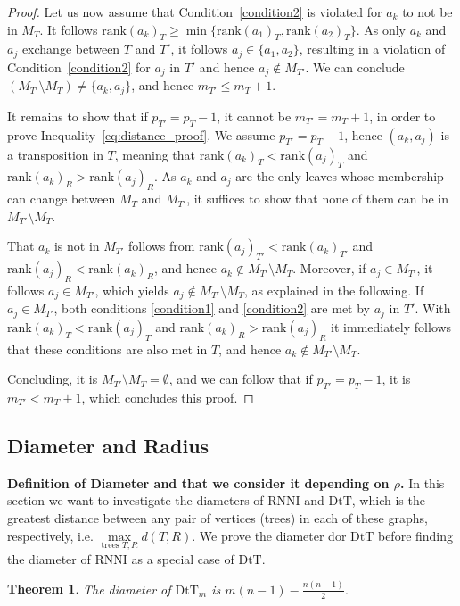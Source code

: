 \documentclass[11pt]{amsart}
\newtheorem{theorem}{Theorem}
\newcommand{\rnni}{\mathrm{RNNI}}
\newcommand{\rank}{\mathrm{rank}}
\newcommand{\dtt}{\mathrm{DtT}}
\newcommand{\summary}[1]{\textbf{#1}} %
\begin{document}
\begin{proof}
	Let us now assume that Condition~\ref{condition2} is violated for $a_k$ to not be in $M_T$.
	It follows $\rank(a_k)_T \geq \min\{\rank(a_1)_T, \rank(a_2)_T\}$.
	As only $a_k$ and $a_j$ exchange between $T$ and $T'$, it follows $a_j \in \{a_1, a_2\}$, resulting in a violation of Condition~\ref{condition2} for $a_j$ in $T'$ and hence $a_j \notin M_{T'}$.
	We can conclude $(M_{T'} \setminus M_T) \neq \{a_k, a_j\}$, and hence $m_{T'} \leq m_T + 1$.

	It remains to show that if $p_{T'} = p_T - 1$, it cannot be $m_{T'} = m_T + 1$, in order to prove Inequality~\ref{eq:distance_proof}.
	We assume $p_{T'} = p_T - 1$, hence $(a_k, a_j)$ is a transposition in $T$, meaning that $\rank(a_k)_T < \rank(a_j)_T$ and $\rank(a_k)_R > \rank(a_j)_R$.
	As $a_k$ and $a_j$ are the only leaves whose membership can change between $M_T$ and $M_{T'}$, it suffices to show that none of them can be in $M_{T'} \setminus M_T$.

	That $a_k$ is not in $M_{T'}$ follows from $\rank(a_j)_{T'} < \rank(a_k)_{T'}$ and $\rank(a_j)_R < \rank(a_k)_R$, and hence $a_k \notin M_{T'} \setminus M_T$.
	Moreover, if $a_j \in M_{T'}$, it follows $a_j \in M_{T'}$, which yields $a_j \notin M_{T'} \setminus M_T$, as explained in the following.
	If $a_j \in M_{T'}$, both conditions \ref{condition1} and \ref{condition2} are met by $a_j$ in $T'$.
	With $\rank(a_k)_T < \rank(a_j)_T$ and $\rank(a_k)_R > \rank(a_j)_R$ it immediately follows that these conditions are also met in $T$, and hence $a_k \notin M_{T'} \setminus M_T$.

	Concluding, it is $M_{T'} \setminus M_T = \emptyset$, and we can follow that if $p_{T'} = p_T - 1$, it is $m_{T'} < m_T + 1$, which concludes this proof.
\end{proof}

\subsection{Diameter and Radius}

\summary{Definition of Diameter and that we consider it depending on $\rho$.}
In this section we want to investigate the diameters of $\rnni$ and $\dtt$, which is the greatest distance between any pair of vertices (trees) in each of these graphs, respectively, i.e. $\max\limits_{\text{trees }T,R}d(T,R)$.
We prove the diameter dor $\dtt$ before finding the diameter of $\rnni$ as a special case of $\dtt$.


\begin{theorem}
	The diameter of $\dtt_m$ is $m(n-1) - \frac{n(n-1)}{2}$.
	\label{thm:dtt_diameter}
\end{theorem}
\end{document}
